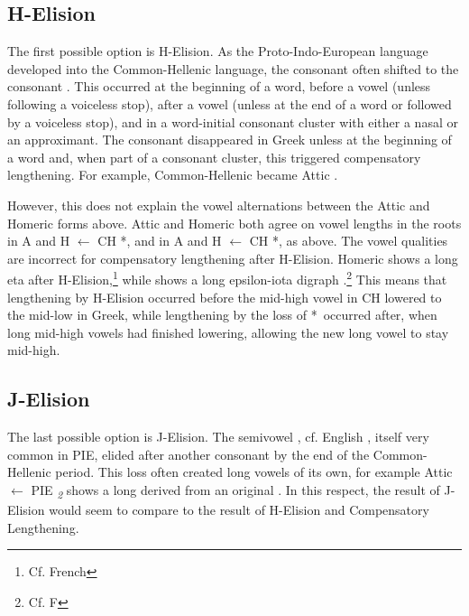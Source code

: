 \subsection{H-Elision}
The first possible option is H-Elision. As the Proto-Indo-European language developed into the Common-Hellenic language, the consonant  often shifted to the consonant . This occurred at the beginning of a word, before a vowel (unless following a voiceless stop), after a vowel (unless at the end of a word or followed by a voiceless stop), and in a word-initial consonant cluster with either a nasal or an approximant.\autocite[168-172]{Smyth_2013}  The consonant  disappeared in Greek unless at the beginning of a word and, when part of a consonant cluster, this triggered compensatory lengthening. For example, Common-Hellenic  became Attic .\autocite[]{Beekes_2009}

However, this does not explain the vowel alternations between the Attic and Homeric forms above. Attic and Homeric both agree on vowel lengths in the roots  in A  and H  $\gets$ CH *,\autocite[]{Beekes_2009} and  in A and H  $\gets$ CH *, as above. The vowel qualities are incorrect for compensatory lengthening after H-Elision. Homeric  shows a long eta  after H-Elision,\footnote{Cf. French } while  shows a long epsilon-iota digraph .\footnote{Cf. F } This means that lengthening by H-Elision occurred before the mid-high vowel  in CH lowered to the mid-low  in Greek, while lengthening by the loss of *\w\ occurred after, when long mid-high vowels had finished lowering, allowing the new long vowel  to stay mid-high. 

\subsection{J-Elision}
The last possible option is J-Elision. The semivowel , cf. English , itself very common in PIE, elided after another consonant by the end of the Common-Hellenic period.\autocite[196]{Smyth_2013} This loss often created long vowels of its own, for example Attic  $\gets$ PIE \textit{\textsubscript{2}} shows a long  derived from an original  .\autocite[τείνω]{Beekes_2009} In this respect, the result of J-Elision would seem to compare to the result of H-Elision and Compensatory Lengthening.

